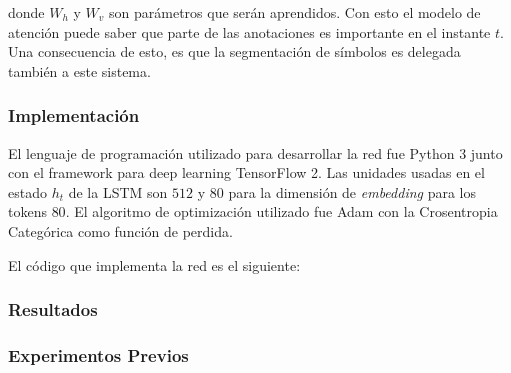 donde $W_{h}$ y $W_{v}$ son parámetros que serán aprendidos. Con esto el modelo de atención puede saber que parte de las anotaciones es importante en el instante $t$. Una consecuencia de esto, es que la segmentación de símbolos es delegada también a este sistema.

\subsubsection{Implementación}

El lenguaje de programación utilizado para desarrollar la red fue Python 3 junto con el framework para deep learning TensorFlow 2. Las unidades usadas en el estado $h_{t}$ de la LSTM son $512$ y $80$ para la dimensión de \textit{embedding} para los tokens $80$. El algoritmo de optimización utilizado fue Adam con la Crosentropia Categórica como función de perdida.

El código que implementa la red es el siguiente:





\subsubsection{Resultados}

\subsubsection{Experimentos Previos}



